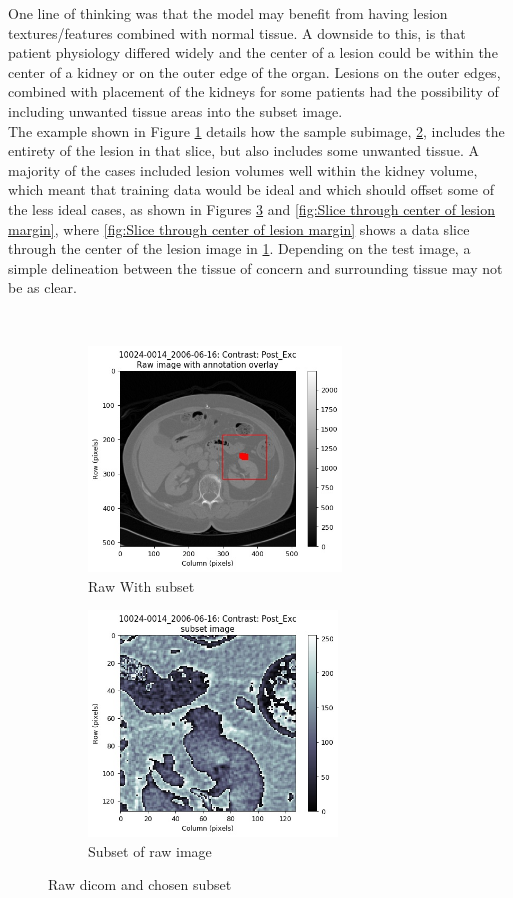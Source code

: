 \documentclass[conference]{IEEEtran}
\begin{document}
One line of thinking was that the model may benefit from having lesion textures/features combined with normal tissue. A downside to this, is that patient physiology differed widely and the center of a lesion could be within the center of a kidney or on the outer edge of the organ. Lesions on the outer edges, combined with placement of the kidneys for some patients had the possibility of including unwanted tissue areas into the subset image.\\
The example shown in Figure \ref{fig:subim1} details how the sample subimage, \ref{fig:subim2}, includes the entirety of the lesion in that slice, but also includes some unwanted tissue. A majority of the cases included lesion volumes well within the kidney volume, which meant that training data would be ideal and which should offset some of the less ideal cases, as shown in Figures \ref{fig:raw with subset} and \ref{fig:Slice through center of lesion margin}, where \ref{fig:Slice through center of lesion margin} shows a data slice through the center of the lesion image in \ref{fig:subim1}. Depending on the test image, a simple delineation between the tissue of concern and surrounding tissue may not be as clear.

\hfill \\
\begin{figure}[hb!]
    \begin{subfigure}{0.65\textwidth}
    \includegraphics[width=0.8\linewidth, height=6cm]{annotation_10024-0014_2006-06-16_0045} 
    \caption{Raw With subset}
    \label{fig:subim1}
    \end{subfigure}
    \begin{subfigure}{0.65\textwidth}
    \includegraphics[width=0.8\linewidth, height=6cm]{subset_10024-0014_2006-06-16_0045}
    \caption{Subset of raw image}
    \label{fig:subim2}
    \end{subfigure}
    \caption{Raw dicom and chosen subset}
    \label{fig:raw with subset}
\end{figure}
\end{document}
